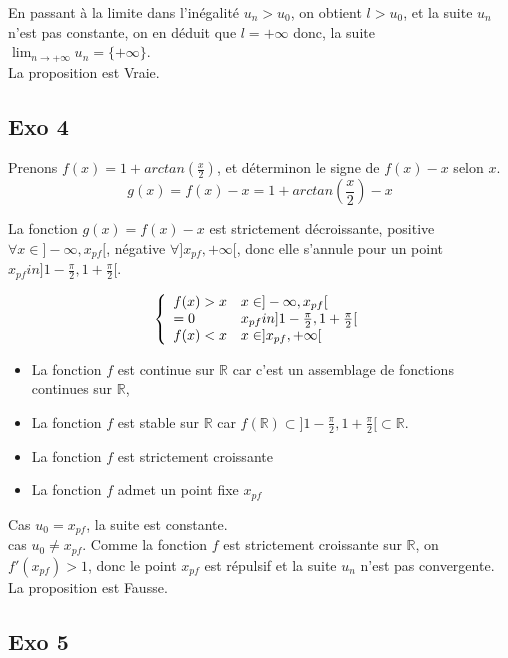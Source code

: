 \documentclass[]{book}
\theoremstyle{definition}
\newcommand{\bb}[1]{\mathbb{#1}}
\newcommand{\R}{\bb{R}}
\begin{document}
En passant \`a la limite dans l'in\'egalit\'e $u_n > u_0$, on obtient $l > u_0$, et la suite $u_n$ n'est pas constante, on en d\'eduit que $l=+\infty$ donc, la suite $\lim_{n \to +\infty} u_n = \{+\infty\}$. \\


La proposition est Vraie.

\subsection*{Exo 4}
Prenons $f(x) = 1 + arctan(\frac{x}{2})$, et d\'eterminon le signe de $f(x) - x$ selon $x$.\\
$$g(x) = f(x) - x = 1 + arctan(\frac{x}{2}) - x$$

La fonction $g(x) = f(x) - x$ est strictement d\'ecroissante, positive $\forall x \in ]-\infty,x_{pf}[$, n\'egative $\forall ]x_{pf},+\infty[$, donc elle s'annule pour un point $x_{pf} in ]1-\frac{\pi}{2}, 1+\frac{\pi}{2}[$.

$$
\left\{ 
\begin{array}{l l}
 f(x)>x & x \in ]-\infty,x_{pf}[\\
 =0 & x_{pf} in ]1-\frac{\pi}{2}, 1+\frac{\pi}{2}[\\
 f(x)<x & x \in ]x_{pf},+\infty[ \\
\end{array}
\right. 
$$

\begin{itemize} 
\item La fonction $f$ est continue sur $\R$ car c'est un assemblage de fonctions continues sur $\R$,
\item La fonction $f$ est stable sur $\R$ car $f(\R) \subset ]1-\frac{\pi}{2},1+\frac{\pi}{2}[ \subset \R$.
\item La fonction $f$ est strictement croissante
\item La fonction $f$ admet un point fixe $x_{pf}$
\end{itemize} 

Cas $u_0=x_{pf}$, la suite est constante.\\
cas $u_0 \neq x_{pf}$. Comme la fonction $f$ est strictement croissante sur $\R$, on  $f'(x_{pf}) > 1$, donc le point $x_{pf}$ est r\'epulsif et la suite $u_n$ n'est pas convergente.\\

La proposition est Fausse.

\subsection*{Exo 5}
\end{document}
